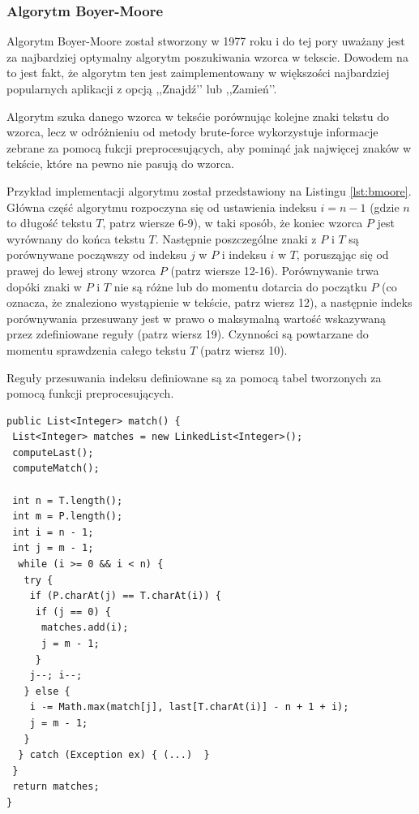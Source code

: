 \documentclass[a4paper,12pt,twoside]{article}
\begin{document}
\newpage

\subsubsection{Algorytm Boyer-Moore}

Algorytm Boyer-Moore został stworzony w 1977 roku i do tej pory uważany jest za najbardziej optymalny algorytm poszukiwania wzorca w tekscie. Dowodem na to jest fakt, że algorytm ten jest zaimplementowany w większości najbardziej popularnych aplikacji z opcją ,,Znajdź’’ lub ,,Zamień’’.

Algorytm szuka danego wzorca w teksćie porównując kolejne znaki tekstu do wzorca, lecz w odróżnieniu od metody brute-force wykorzystuje informacje zebrane za pomocą fukcji preprocesujących, aby pominąć jak najwięcej znaków w tekście, które na pewno nie pasują do wzorca.

Przykład implementacji algorytmu został przedstawiony na Listingu \ref{lst:bmoore}. Główna część algorytmu rozpoczyna się od ustawienia indeksu $i = n - 1$ (gdzie $n$ to długość tekstu $T$, patrz wiersze 6-9), w taki sposób, że koniec wzorca $P$ jest wyrównany do końca tekstu $T$. Następnie poszczególne znaki z $P$ i $T$ są porównywane począwszy od indeksu $j$ w $P$ i indeksu $i$ w $T$, porusząjąc się od prawej do lewej strony wzorca $P$ (patrz wiersze 12-16). Porównywanie trwa dopóki znaki w $P$ i $T$ nie są różne lub do momentu dotarcia do początku $P$ (co oznacza, że znaleziono wystąpienie w tekście, patrz wiersz 12), a następnie indeks porównywania przesuwany jest w prawo o maksymalną wartość wskazywaną przez zdefiniowane reguły (patrz wiersz 19). Czynności są powtarzane do momentu sprawdzenia całego tekstu $T$ (patrz wiersz 10).

Reguły przesuwania indeksu definiowane są za pomocą tabel tworzonych za pomocą funkcji preprocesujących.
\\
\begin{lstlisting}[caption={Przykładowa implementacja algorytmu Boyer-Moore wyszukująca wzorzec $P$ w tekście $T$.}, label={lst:bmoore}]
public List<Integer> match() {
 List<Integer> matches = new LinkedList<Integer>();
 computeLast();
 computeMatch();

 int n = T.length();
 int m = P.length();
 int i = n - 1;
 int j = m - 1;
  while (i >= 0 && i < n) {
   try {
    if (P.charAt(j) == T.charAt(i)) {
	 if (j == 0) {
	  matches.add(i);
	  j = m - 1;
     }
	j--; i--;
   } else {
    i -= Math.max(match[j], last[T.charAt(i)] - n + 1 + i);
    j = m - 1;
   }
  } catch (Exception ex) { (...)  }
 }
 return matches;
}
\end{lstlisting}
\end{document}
